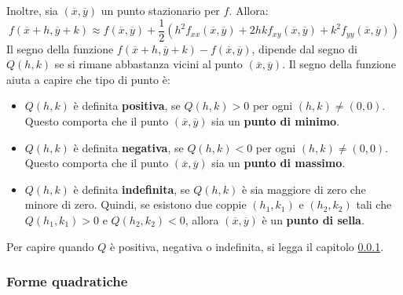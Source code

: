 \documentclass[a4paper]{article}
\newcommand{\definition}[1]{\textcolor{Red3}{\textbf{#1}}}
\begin{document}
	\noindent
	Inoltre, sia $\left(\overline{x}, \overline{y}\right)$ un punto stazionario per $f$. Allora:
	\begin{equation*}
		f\left(\overline{x}+h, \overline{y}+k\right) \approx f\left(\overline{x}, \overline{y}\right) + \dfrac{1}{2} \left(h^{2} f_{xx}\left(\overline{x}, \overline{y}\right) + 2 hk f_{xy}\left(\overline{x}, \overline{y}\right) + k^{2}f_{yy}\left(\overline{x}, \overline{y}\right)\right)
	\end{equation*}
	Il segno della funzione $f\left(\overline{x}+h, \overline{y}+k\right) - f\left(\overline{x}, \overline{y}\right)$, dipende dal segno di $Q\left(h,k\right)$ se si rimane abbastanza vicini al punto $\left(\overline{x}, \overline{y}\right)$. Il segno della funzione aiuta a capire che tipo di punto è:
	\begin{boxdef}
		\begin{itemize}
			\item $Q\left(h,k\right)$ è definita \definition{positiva}, se $Q\left(h,k\right) > 0$ per ogni $\left(h,k\right) \ne \left(0,0\right)$. Questo comporta che il punto $\left(\overline{x}, \overline{y}\right)$ sia un \definition{punto di minimo}.

			\item $Q\left(h,k\right)$ è definita \definition{negativa}, se $Q\left(h,k\right) < 0$ per ogni $\left(h,k\right) \ne \left(0,0\right)$. Questo comporta che il punto $\left(\overline{x}, \overline{y}\right)$ sia un \definition{punto di massimo}.

			\item $Q\left(h,k\right)$ è definita \definition{indefinita}, se $Q\left(h,k\right)$ è sia maggiore di zero che minore di zero. Quindi, se esistono due coppie $\left(h_{1}, k_{1}\right)$ e $\left(h_{2}, k_{2}\right)$ tali che $Q\left(h_{1},k_{1}\right)>0$ e $Q\left(h_{2},k_{2}\right)<0$, allora $\left(\overline{x}, \overline{y}\right)$ è un \definition{punto di sella}.
		\end{itemize}
	\end{boxdef}

	\noindent
	Per capire quando $Q$ è positiva, negativa o indefinita, si legga il capitolo \ref{subsubsection: forme quadratiche}.

	\newpage

	\subsubsection{Forme quadratiche}\label{subsubsection: forme quadratiche}
\end{document}

